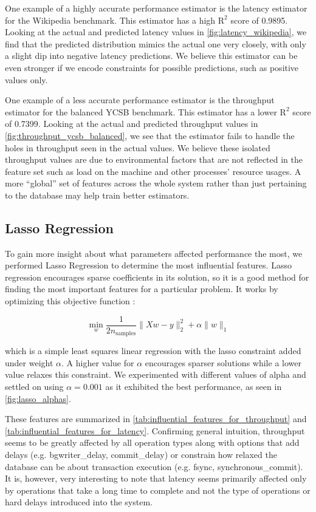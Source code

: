 One example of a highly accurate performance estimator is the latency estimator
for the Wikipedia benchmark. This estimator has a high $\textrm{R}^2$
score of 0.9895. Looking at the actual and predicted latency values in
\cref{fig:latency_wikipedia}, we find that the
predicted distribution mimics the actual one very closely, with only a
slight dip into negative latency predictions. We believe this
estimator can be even stronger if we encode constraints for possible
predictions, such as positive values only.

One example of a less accurate performance estimator is the throughput
estimator for the balanced YCSB benchmark. This estimator has a lower
$\textrm{R}^2$ score of 0.7399. Looking at the actual and predicted
throughput values in \cref{fig:throughput_ycsb_balanced}, we see that
the estimator fails to handle the holes in throughput seen in the
actual values. We believe these isolated throughput values are due to
environmental factors that are not reflected in the feature set such
as load on the machine and other processes' resource usages. A more
``global'' set of features across the whole system rather than just
pertaining to the database may help train better estimators.

\subsection{Lasso Regression}
\label{sec:lasso}

To gain more insight about what parameters affected performance the
most, we performed Lasso Regression to determine the most influential
features. Lasso regression encourages sparse coefficients in its
solution, so it is a good method for finding the most important
features for a particular problem. It works by optimizing this
objective function :

\begin{equation*}
  \min\limits_{w}
  \frac{1}{2n_{\textrm{samples}}} \|Xw - y\|_2^2 + \alpha \|w\|_1
\end{equation*}

which is a simple least squares linear regression with the lasso
constraint added under weight $\alpha$. A higher value for $\alpha$
encourages sparser solutions while a lower value relaxes this
constraint. We experimented with different values of alpha and settled
on using $\alpha = 0.001$ as it exhibited the best performance, as seen in
\cref{fig:lasso_alphas}.

 These features are summarized in
\cref{tab:influential_features_for_throughput} and
\cref{tab:influential_features_for_latency}. Confirming general
intuition, throughput seems to be greatly affected by all operation
types along with options that add delays (e.g. bgwriter\_delay,
commit\_delay) or constrain how relaxed the database can be about
transaction execution (e.g. fsync, synchronous\_commit). It
is, however, very interesting to note that latency seems
primarily affected only by operations that take a long time to
complete and not the type of operations or hard delays introduced into the
system.

